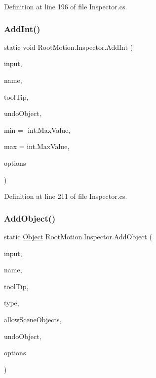 Definition at line 196 of file Inspector.\+cs.

\mbox{\label{class_root_motion_1_1_inspector_af43d0270035b8725fdddd30252c9cc86}} 
\subsubsection{\texorpdfstring{Add\+Int()}{AddInt()}}
{\footnotesize\ttfamily static void Root\+Motion.\+Inspector.\+Add\+Int (\begin{DoxyParamCaption}\item[{ref int}]{input,  }\item[{string}]{name,  }\item[{string}]{tool\+Tip,  }\item[{\mbox{\hyperlink{_quads_8cs_aef19bab18b9814edeef255c43e4f6bbc}{Object}}}]{undo\+Object,  }\item[{int}]{min = {\ttfamily -\/int.MaxValue},  }\item[{int}]{max = {\ttfamily int.MaxValue},  }\item[{params G\+U\+I\+Layout\+Option \mbox{[}$\,$\mbox{]}}]{options }\end{DoxyParamCaption})\hspace{0.3cm}{\ttfamily [static]}}



Definition at line 211 of file Inspector.\+cs.

\mbox{\label{class_root_motion_1_1_inspector_a6437d1e0566072580c22b4ef6def12d7}} 
\subsubsection{\texorpdfstring{Add\+Object()}{AddObject()}}
{\footnotesize\ttfamily static \mbox{\hyperlink{_quads_8cs_aef19bab18b9814edeef255c43e4f6bbc}{Object}} Root\+Motion.\+Inspector.\+Add\+Object (\begin{DoxyParamCaption}\item[{\mbox{\hyperlink{_quads_8cs_aef19bab18b9814edeef255c43e4f6bbc}{Object}}}]{input,  }\item[{string}]{name,  }\item[{string}]{tool\+Tip,  }\item[{System.\+Type}]{type,  }\item[{bool}]{allow\+Scene\+Objects,  }\item[{\mbox{\hyperlink{_quads_8cs_aef19bab18b9814edeef255c43e4f6bbc}{Object}}}]{undo\+Object,  }\item[{params G\+U\+I\+Layout\+Option \mbox{[}$\,$\mbox{]}}]{options }\end{DoxyParamCaption})\hspace{0.3cm}{\ttfamily [static]}}




